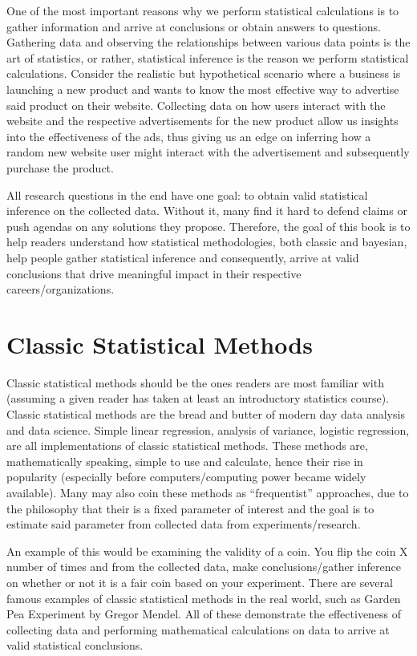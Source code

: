 \documentclass[
  letterpaper,
  DIV=11,
  numbers=noendperiod]{scrreprt}
\begin{document}
One of the most important reasons why we perform statistical
calculations is to gather information and arrive at conclusions or
obtain answers to questions. Gathering data and observing the
relationships between various data points is the art of statistics, or
rather, statistical inference is the reason we perform statistical
calculations. Consider the realistic but hypothetical scenario where a
business is launching a new product and wants to know the most effective
way to advertise said product on their website. Collecting data on how
users interact with the website and the respective advertisements for
the new product allow us insights into the effectiveness of the ads,
thus giving us an edge on inferring how a random new website user might
interact with the advertisement and subsequently purchase the product.

All research questions in the end have one goal: to obtain valid
statistical inference on the collected data. Without it, many find it
hard to defend claims or push agendas on any solutions they propose.
Therefore, the goal of this book is to help readers understand how
statistical methodologies, both classic and bayesian, help people gather
statistical inference and consequently, arrive at valid conclusions that
drive meaningful impact in their respective careers/organizations.

\hypertarget{classic-statistical-methods}{%
\section{Classic Statistical
Methods}\label{classic-statistical-methods}}

Classic statistical methods should be the ones readers are most familiar
with (assuming a given reader has taken at least an introductory
statistics course). Classic statistical methods are the bread and butter
of modern day data analysis and data science. Simple linear regression,
analysis of variance, logistic regression, are all implementations of
classic statistical methods. These methods are, mathematically speaking,
simple to use and calculate, hence their rise in popularity (especially
before computers/computing power became widely available). Many may also
coin these methods as ``frequentist'' approaches, due to the philosophy
that their is a fixed parameter of interest and the goal is to estimate
said parameter from collected data from experiments/research.

An example of this would be examining the validity of a coin. You flip
the coin X number of times and from the collected data, make
conclusions/gather inference on whether or not it is a fair coin based
on your experiment. There are several famous examples of classic
statistical methods in the real world, such as Garden Pea Experiment by
Gregor Mendel. All of these demonstrate the effectiveness of collecting
data and performing mathematical calculations on data to arrive at valid
statistical conclusions.
\end{document}
